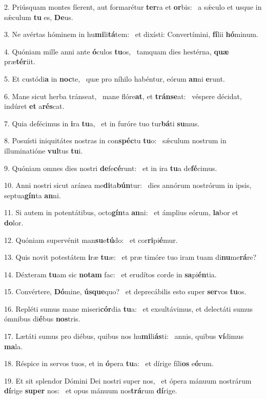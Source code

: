 2. Priúsquam montes fíerent, aut formarétur \textbf{ter}ra et \textbf{or}bis: \ast\  a sǽculo et usque in sǽculum \textbf{tu} es, \textbf{De}us.\

3. Ne avértas hóminem in hu\textbf{mi}li\textbf{tá}tem: \ast\  et dixísti: Convertímini, \textbf{fí}lii \textbf{hó}minum.\

4. Quóniam mille anni ante \textbf{ó}culos \textbf{tu}os, \ast\  tamquam dies hestérna, \textbf{quæ} præ\textbf{tér}iit.\

5. Et custódi\textbf{a} in \textbf{noc}te, \ast\  quæ pro níhilo habéntur, eórum \textbf{an}ni \textbf{e}runt.\

6. Mane sicut herba tránseat, \dag\  mane flóre\textbf{at}, et \textbf{tráns}\textbf{e}at: \ast\  véspere décidat, indúret \textbf{et} a\textbf{rés}cat.\

7. Quia defécimus in \textbf{i}ra \textbf{tu}a, \ast\  et in furóre tuo tur\textbf{bá}ti \textbf{su}mus.\

8. Posuísti iniquitátes nostras in con\textbf{spéc}tu \textbf{tu}o: \ast\  sǽculum nostrum in illuminatióne \textbf{vul}tus \textbf{tu}i.\

9. Quóniam omnes dies nostri \textbf{de}fe\textbf{cé}runt: \ast\  et in ira \textbf{tu}a de\textbf{fé}cimus.\

10. Anni nostri sicut aránea me\textbf{di}ta\textbf{bún}tur: \ast\  dies annórum nostrórum in ipsis, septua\textbf{gín}ta \textbf{an}ni.\

11. Si autem in potentátibus, octo\textbf{gín}ta \textbf{an}ni: \ast\  et ámplius eórum, \textbf{la}bor et \textbf{do}lor.\

12. Quóniam supervénit man\textbf{su}e\textbf{tú}do: \ast\  et cor\textbf{ri}pi\textbf{é}mur.\

13. Quis novit potestátem \textbf{i}ræ \textbf{tu}æ: \ast\  et præ timóre tuo iram tuam di\textbf{nu}me\textbf{rá}re?\

14. Déxteram \textbf{tu}am sic \textbf{no}\textbf{tam} fac: \ast\  et erudítos corde in \textbf{sa}pi\textbf{én}tia.\

15. Convértere, \textbf{Dó}mine, \textbf{ús}\textbf{que}quo? \ast\  et deprecábilis esto super \textbf{ser}vos \textbf{tu}os.\

16. Repléti sumus mane miseri\textbf{cór}dia \textbf{tu}a: \ast\  et exsultávimus, et delectáti sumus ómnibus di\textbf{é}bus \textbf{nos}tris.\

17. Lætáti sumus pro diébus, quibus nos hu\textbf{mi}li\textbf{ás}ti: \ast\  annis, quibus \textbf{ví}dimus \textbf{ma}la.\

18. Réspice in servos tuos, et in \textbf{ó}pera \textbf{tu}a: \ast\  et dírige fíli\textbf{os} e\textbf{ó}rum.\

19. Et sit splendor Dómini Dei nostri super nos, \dag\  et ópera mánuum nostrárum \textbf{dí}rige \textbf{su}\textbf{per} nos: \ast\  et opus mánuum nos\textbf{trá}rum \textbf{dí}rige.\

